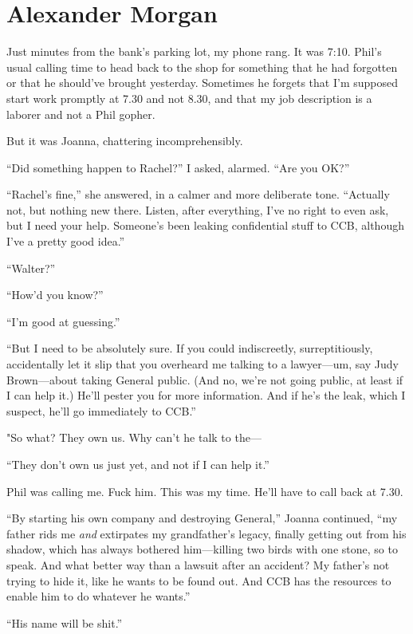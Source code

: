 \chapter{Alexander Morgan}

\titlemark

Just minutes from the bank's parking lot, my phone rang. It was 7:10.
Phil's usual calling time to head back to the shop for something that he
had forgotten or that he should've brought yesterday. Sometimes he
forgets that I'm supposed start work promptly at 7.30 and not 8.30, and
that my job description is a laborer and not a Phil gopher.

But it was Joanna, chattering incomprehensibly.

``Did something happen to Rachel?'' I asked, alarmed. ``Are you OK?''

``Rachel's fine,'' she answered, in a calmer and more deliberate tone.
``Actually not, but nothing new there. Listen, after everything, I've no
right to even ask, but I need your help. Someone's been leaking
confidential stuff to CCB, although I've a pretty good idea.''

``Walter?''

``How'd you know?''

``I'm good at guessing.''

``But I need to be absolutely sure. If you could indiscreetly,
surreptitiously, accidentally let it slip that you overheard me talking
to a lawyer---um, say Judy Brown---about taking General public. (And no,
we're not going public, at least if I can help it.) He'll pester you for
more information. And if he's the leak, which I suspect, he'll go
immediately to CCB.''

"So what? They own us. Why can't he talk to the---

``They don't own us just yet, and not if I can help it.''

Phil was calling me. Fuck him. This was my time. He'll have to call back
at 7.30.

``By starting his own company and destroying General,'' Joanna
continued, ``my father rids me \emph{and} extirpates my grandfather's
legacy, finally getting out from his shadow, which has always bothered
him---killing two birds with one stone, so to speak. And what better way
than a lawsuit after an accident? My father's not trying to hide it,
like he wants to be found out. And CCB has the resources to enable him
to do whatever he wants.''

``His name will be shit.''

